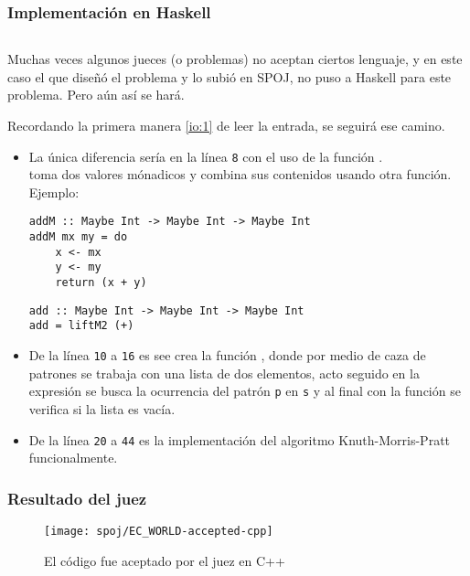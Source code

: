 \newpage

\subsubsection{Implementación en Haskell}
\inputminted[linenos, frame=lines]{haskell}{problemas/haskell/EC_WORLD.hs}

Muchas veces algunos jueces (o problemas) no aceptan ciertos lenguaje, y en este caso el que
diseñó el problema y lo subió en SPOJ, no puso a Haskell para este problema. Pero aún así se hará.

Recordando la primera manera \ref{io:1} de leer la entrada, se seguirá ese camino.

\begin{itemize}
\item La única diferencia sería en la línea \texttt{8} con el uso de la función .\\
 toma dos valores mónadicos y
combina sus contenidos usando otra función. Ejemplo:
\begin{verbatim}
addM :: Maybe Int -> Maybe Int -> Maybe Int
addM mx my = do
    x <- mx
    y <- my
    return (x + y)
\end{verbatim}

\begin{verbatim}
add :: Maybe Int -> Maybe Int -> Maybe Int
add = liftM2 (+)
\end{verbatim}

\item De la línea \texttt{10} a \texttt{16} es see crea la función
, donde por medio de caza de patrones se trabaja con una
lista de dos elementos, acto seguido en la expresión  se busca la ocurrencia
del patrón \texttt{p} en \texttt{s} y al final con la función
 se verifica si la lista es vacía.  

\item De la línea \texttt{20} a \texttt{44} es la implementación del algoritmo Knuth-Morris-Pratt
funcionalmente.
\end{itemize}

\subsubsection{Resultado del juez}
\begin{figure}[H]
\centering
\texttt{[image: spoj/EC\_WORLD-accepted-cpp]}
\caption{El código fue aceptado por el juez en C++}
\end{figure}

